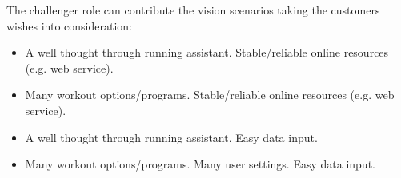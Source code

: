 The challenger role can contribute the vision scenarios taking the customers wishes into consideration:

\begin{itemize}
\item A well thought through running assistant. Stable/reliable online resources (e.g. web service).%
\item Many workout options/programs. Stable/reliable online resources (e.g. web service). %
\item A well thought through running assistant. Easy data input.  %
\item Many workout options/programs. Many user settings. Easy data input.  %
\end{itemize}








